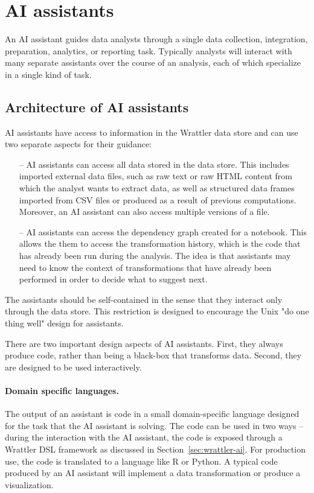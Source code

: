 \documentclass[sigplan,preprint,10pt]{acmart}\settopmatter{printfolios=true,printccs=false,printacmref=false}
\theoremstyle{plain}
\theoremstyle{definition}
\begin{document}
\section{AI assistants}
\label{sec:ai}

{\color{blue}
An AI assistant guides data analysts through a single data collection, integration, preparation, 
analytics, or reporting task. Typically analysts will interact with many separate assistants over 
the course of an analysis, each of which specialize in a single kind of task.
}
\subsection{Architecture of AI assistants}

{\color{blue}
AI assistants have access to information in the Wrattler data store and can use two separate
aspects for their guidance:
%
\begin{itemize}
\item[--] AI assistants can access all data stored in the data
store. This includes imported external data files, such as raw text or raw HTML content from which
the analyst wants to extract data, as well as structured data frames imported from CSV files or
produced as a result of previous computations. Moreover, an AI assistant can also access multiple
versions of a file.
\vspace{0.25em}

\item[--] AI assistants can access the dependency graph created for a 
notebook. This allows the them to access the transformation history, which is the code 
that has already been run during the analysis. The idea is that assistants may need to know the 
context of transformations that have already been performed in order to decide what to suggest next.
\end{itemize}

The assistants should be self-contained in the sense that they interact only through the 
data store. This restriction is designed to encourage the Unix "do one thing well" design for 
assistants.

There are two important design aspects of AI assistants. First, they always produce code, rather
than being a black-box that transforms data. Second, they are designed to be used interactively. 

\paragraph{Domain specific languages.}
The output of an assistant is code in a small domain-specific language designed for the task that
the AI assistant is solving. The code can be used in two ways -- during the interaction with the
AI assistant, the code is exposed through a Wrattler DSL framework as discussed in 
Section~\ref{sec:wrattler-ai}. For production use, the code is translated to a language like R or 
Python. A typical code produced by an AI assistant will implement a data transformation or
produce a visualization.

}
\end{document}
